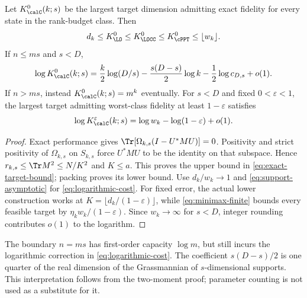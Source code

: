 \begin{corollary}\label{cor:targets}
Let $K_{\calC}^0(k;s)$ be the largest target dimension admitting exact fidelity for every state in the rank-budget class. Then
\begin{equation}\label{eq:exact-target-bound}
 d_k\le K_{\LO}^0\le K_{\LOCC}^0\le K_{\cPPT}^0\le\lfloor w_k\rfloor.
\end{equation}
If $n\le ms$ and $s<D$,
\begin{equation}\label{eq:logarithmic-cost}
 \log K_{\calC}^0(k;s)
 =\frac k2\log(D/s)-\frac{s(D-s)}2\log k-\frac12\log c_{D,s}+o(1).
\end{equation}
If $n>ms$, instead $K_{\calC}^0(k;s)=m^k$ eventually. For $s<D$ and fixed $0<\varepsilon<1$, the largest target admitting worst-class fidelity at least $1-\varepsilon$ satisfies
\begin{equation}\label{eq:fixed-error-minimax}
 \log K_{\calC}^{\varepsilon}(k;s)
 =\log w_k-\log(1-\varepsilon)+o(1).
\end{equation}
\end{corollary}
\begin{proof}
Exact performance gives $\Tr[\Omega_{k,s}(I-U^*MU)]=0$. Positivity and strict positivity of $\Omega_{k,s}$ on $S_{k,s}$ force $U^*MU$ to be the identity on that subspace. Hence $r_{k,s}\le\Tr M^2\le N/K^2$ and $K\le a$. This proves the upper bound in \eqref{eq:exact-target-bound}; packing proves its lower bound. Use $d_k/w_k\to1$ and \eqref{eq:support-asymptotic} for \eqref{eq:logarithmic-cost}. For fixed error, the actual lower construction works at $K=\lfloor d_k/(1-\varepsilon)\rfloor$, while \eqref{eq:minimax-finite} bounds every feasible target by $\eta_kw_k/(1-\varepsilon)$. Since $w_k\to\infty$ for $s<D$, integer rounding contributes $o(1)$ to the logarithm.
\end{proof}

The boundary $n=ms$ has first-order capacity $\log m$, but still incurs the logarithmic correction in \eqref{eq:logarithmic-cost}. The coefficient $s(D-s)/2$ is one quarter of the real dimension of the Grassmannian of $s$-dimensional supports. This interpretation follows from the two-moment proof; parameter counting is not used as a substitute for it.

